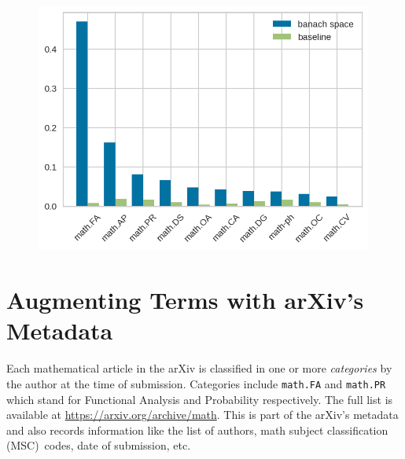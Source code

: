 \documentclass[submission,copyright,creativecommons]{eptcs}
\begin{document}
\begin{figure}[h!]
\begin{minipage}{0.4\textwidth}
\end{minipage}\hfill
\begin{minipage}{0.55\textwidth}
    \centering
    \includegraphics[width=0.99\textwidth]{barcomp.png}
\end{minipage}
\end{figure}


\section{Augmenting Terms with arXiv's Metadata}
Each mathematical article in the arXiv is classified in one or more
\emph{categories}  by the author at
the time of submission. Categories include \texttt{math.FA} and  \texttt{math.PR} which stand for Functional Analysis and Probability respectively. The full list is available at \url{https://arxiv.org/archive/math}.
This is part of  the arXiv's metadata and also records information like the list of authors, math subject classification (MSC)~codes, date of submission, etc. 
\end{document}
